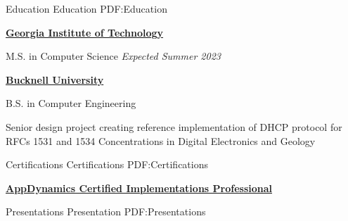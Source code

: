 \documentclass[letterpaper,MMMMyyyy,nonstopmode]{simpleresumecv}
\newif\ifLOCATION
\begin{document}
\begin{Body}
\Section
{Education}
{Education}
{PDF:Education}

\Entry
\href{https://gatech.edu}
{\textbf{Georgia Institute of Technology}}

M.S. in Computer Science
\hfill 
\textit{Expected Summer 2023}


\Gap

\Entry
\href{http://www.bucknell.edu/}
{\textbf{Bucknell University}}
\ifLOCATION
\hfill Lewisburg, Pennsylvania
\fi

B.S. in Computer Engineering
\iffalse
\hfill
\DatestampYM{1988}{09} --
\DatestampYM{1992}{06}
\fi
\begin{Detail}
\BulletItem
Senior design project creating reference implementation of DHCP protocol for RFCs 1531 and 1534
\BulletItem
Concentrations in Digital Electronics and Geology

\end{Detail}


\Section
{Certifications}
{Certifications}
{PDF:Certifications}

\Entry
\href{https://www.appdynamics.com/certifications/}
{\textbf{AppDynamics Certified Implementations Professional}}
\hfill
{}
\iffalse
\begin{Detail}
\begin{quote}
``An individual who attains the AppDynamics Certified Implementation Professional certification has demonstrated that he or she possesses the minimum acceptable level of knowledge and skills required to deploy AppDynamics Controllers, Agents, EUM Servers and Analytics Servers. 
This individual also has experience using AppDynamics APIs to extend and customize the AppDynamics platform.''
\end{quote}
\end{Detail}
\fi



\newif\ifA
\newif\ifB
\newif\ifC
\Afalse
\Bfalse
\Cfalse
\ifA

\Section
{Presentations}%
{Presentation}%
{PDF:Presentations}%


\end{Body}
\end{document}
